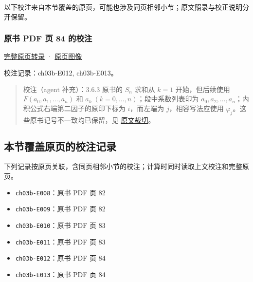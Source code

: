 \documentclass[
  10pt,
  fontset=fandol]{ctexart}
\providecommand{\tightlist}{%
  \setlength{\itemsep}{0pt}\setlength{\parskip}{0pt}}
\begin{document}
以下校注来自本节覆盖的原页，可能也涉及同页相邻小节；原文照录与校正说明分开保留。

\subsubsection{原书 PDF 页 84 的校注}\label{ux539fux4e66-pdf-ux9875-84-ux7684ux6821ux6ce8}

\href{../pages/pdf-084.md}{完整原页转录} · \href{../../source-images/pdf-084.jpeg}{原页图像}

校注记录：ch03b-E012, ch03b-E013。

\begin{quote}
校注（agent 补充）：3.6.3 原书的 \(S_n\) 求和从 \(k=1\) 开始，但后续使用 \(F(a_0,a_1,\ldots,a_n)\) 和 \(a_k\;(k=0,\ldots,n)\)；段中系数列表印为 \(a_0,a_2,\ldots,a_n\)；内积公式右端第二因子的原印下标为 \(i\)，而左端为 \(j\)，相容写法应使用 \(\varphi_j\)。这些原书记号不一致均已保留，见 \href{../assets/ch03b/p084-multivariate-formulas.png}{原文裁切}。
\end{quote}

\subsection{本节覆盖原页的校注记录}\label{ux672cux8282ux8986ux76d6ux539fux9875ux7684ux6821ux6ce8ux8bb0ux5f55}

下列记录按原页关联，含同页相邻小节的校注；计算时同时读取上文校注和完整原页。

\begin{itemize}
\tightlist
\item
  \texttt{ch03b-E008}：原书 PDF 页 82
\item
  \texttt{ch03b-E009}：原书 PDF 页 82
\item
  \texttt{ch03b-E010}：原书 PDF 页 83
\item
  \texttt{ch03b-E011}：原书 PDF 页 83
\item
  \texttt{ch03b-E012}：原书 PDF 页 84
\item
  \texttt{ch03b-E013}：原书 PDF 页 84
\end{itemize}
\end{document}
